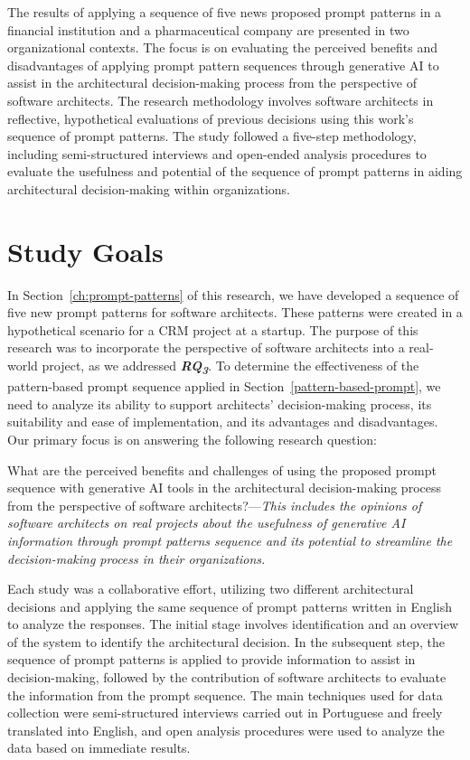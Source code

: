 The results of applying a sequence of five news proposed prompt patterns in a financial institution and a pharmaceutical company are presented in two organizational contexts. The focus is on evaluating the perceived benefits and disadvantages of applying prompt pattern sequences through generative AI to assist in the architectural decision-making process from the perspective of software architects. The research methodology involves software architects in reflective, hypothetical evaluations of previous decisions using this work's sequence of prompt patterns. The study followed a five-step methodology, including semi-structured interviews and open-ended analysis procedures to evaluate the usefulness and potential of the sequence of prompt patterns in aiding architectural decision-making within organizations.

\section{Study Goals}
In Section~\ref{ch:prompt-patterns} of this research, we have developed a sequence of five new prompt patterns for software architects. These patterns were created in a hypothetical scenario for a CRM project at a startup. The purpose of this research was to incorporate the perspective of software architects into a real-world project, as we addressed \textbf{\textit{RQ\textsubscript{3}}}. To determine the effectiveness of the pattern-based prompt sequence applied in Section~\ref{pattern-based-prompt}, we need to analyze its ability to support architects' decision-making process, its suitability and ease of implementation, and its advantages and disadvantages. Our primary focus is on answering the following research question:

What are the perceived benefits and challenges of using the proposed prompt sequence with generative AI tools in the architectural decision-making process from the perspective of software architects?---\textit{This includes the opinions of software architects on real projects about the usefulness of generative AI information through prompt patterns sequence and its potential to streamline the decision-making process in their organizations.
}

Each study was a collaborative effort, utilizing two different architectural decisions and applying the same sequence of prompt patterns written in English to analyze the responses. The initial stage involves identification and an overview of the system to identify the architectural decision. In the subsequent step, the sequence of prompt patterns is applied to provide information to assist in decision-making, followed by the contribution of software architects to evaluate the information from the prompt sequence. The main techniques used for data collection were semi-structured interviews carried out in Portuguese and freely translated into English, and open analysis procedures were used to analyze the data based on immediate results.

